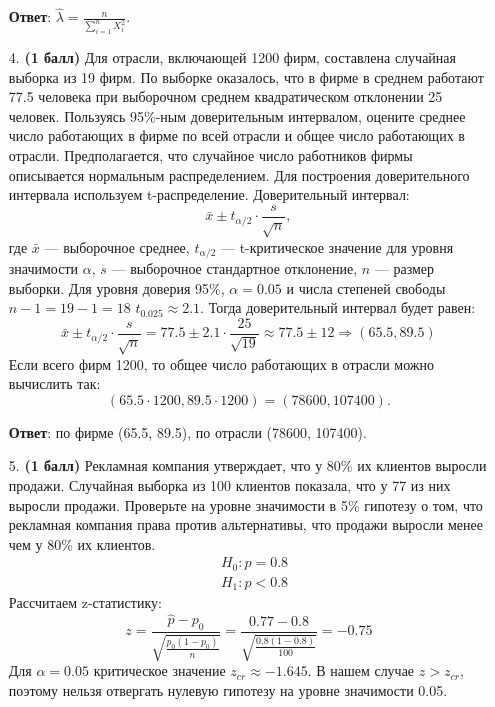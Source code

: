\documentclass{assignment}
\begin{document}
\begin{enumerate}
    \textbf{Ответ}: $\hat{\lambda} = \frac{n}{\sum_{i=1}^{n} X_i^2}$.
    \finish

    \item[4.] \textbf{(1 балл)} Для отрасли, включающей 1200 фирм, составлена случайная выборка из 19 фирм. По выборке оказалось, что в фирме в среднем работают 77.5 человека при выборочном среднем квадратическом отклонении 25 человек. Пользуясь 95\%-ным доверительным интервалом, оцените среднее число работающих в фирме по всей отрасли и общее число работающих в отрасли. Предполагается, что случайное число работников фирмы описывается нормальным распределением.
    \start
    Для построения доверительного интервала используем t-распределение. Доверительный интервал:
    \begin{equation}
        \bar{x} \pm t_{\alpha/2}\cdot \frac{s}{\sqrt{n}},
    \end{equation}
    где $\bar{x}$ — выборочное среднее, $t_{\alpha/2}$ — t-критическое значение для уровня значимости $\alpha$, $s$ — выборочное стандартное отклонение, $n$ — размер выборки. Для уровня доверия 95\%, $\alpha = 0.05$ и числа степеней свободы $n-1 = 19-1 = 18$ $t_0.025 \approx 2.1$. Тогда доверительный интервал будет равен:
    \begin{equation}
        \bar{x} \pm t_{\alpha/2}\cdot \frac{s}{\sqrt{n}} = 77.5 \pm 2.1\cdot \frac{25}{\sqrt{19}} \approx 77.5 \pm 12 \Rightarrow (65.5, 89.5)
    \end{equation}
    Если всего фирм 1200, то общее число работающих в отрасли можно вычислить так:
    \begin{equation}
        (65.5\cdot 1200, 89.5\cdot 1200) = (78600, 107400).
    \end{equation}

    \textbf{Ответ}: по фирме (65.5, 89.5), по отрасли (78600, 107400).
    \finish

    \item[5.] \textbf{(1 балл)} Рекламная компания утверждает, что у 80\% их клиентов выросли продажи. Случайная выборка из 100 клиентов показала, что у 77 из них выросли продажи. Проверьте на уровне значимости в 5\% гипотезу о том, что рекламная компания права против альтернативы, что продажи выросли менее чем у 80\% их клиентов.
    \start
    \begin{align*}
        &H_0: p=0.8 \\
        &H_1: p<0.8
    \end{align*}
    Рассчитаем z-статистику:
    \begin{equation}
        z = \frac{\hat{p} - p_0}{\sqrt{\frac{p_0(1-p_0)}{n}}} = \frac{0.77 - 0.8}{\sqrt{\frac{0.8(1-0.8)}{100}}} = -0.75
    \end{equation}
    Для $\alpha = 0.05$ критическое значение $z_{cr} \approx -1.645$. В нашем случае $z > z_{cr}$, поэтому нельзя отвергать нулевую гипотезу на уровне значимости 0.05.
    

\end{enumerate}
\end{document}

